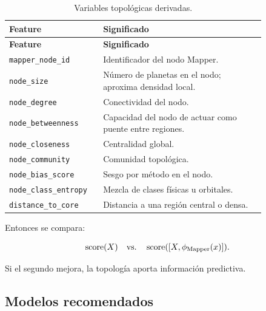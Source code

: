 \documentclass[11pt,letterpaper]{article}
\begin{document}
\begin{longtable}{p{0.26\linewidth}p{0.58\linewidth}}
\caption{Variables topológicas derivadas.}\\
\toprule
\textbf{Feature} & \textbf{Significado} \\
\midrule
\endfirsthead
\toprule
\textbf{Feature} & \textbf{Significado} \\
\midrule
\endhead
\texttt{mapper\_node\_id} & Identificador del nodo Mapper. \\
\texttt{node\_size} & Número de planetas en el nodo; aproxima densidad local. \\
\texttt{node\_degree} & Conectividad del nodo. \\
\texttt{node\_betweenness} & Capacidad del nodo de actuar como puente entre regiones. \\
\texttt{node\_closeness} & Centralidad global. \\
\texttt{node\_community} & Comunidad topológica. \\
\texttt{node\_bias\_score} & Sesgo por método en el nodo. \\
\texttt{node\_class\_entropy} & Mezcla de clases físicas u orbitales. \\
\texttt{distance\_to\_core} & Distancia a una región central o densa. \\
\bottomrule
\end{longtable}

Entonces se compara:

\begin{equation}
\operatorname{score}(X)\quad \text{vs.}\quad \operatorname{score}([X,\phi_{\rm Mapper}(x)]).
\end{equation}

Si el segundo mejora, la topología aporta información predictiva.

\subsection{Modelos recomendados}
\end{document}

